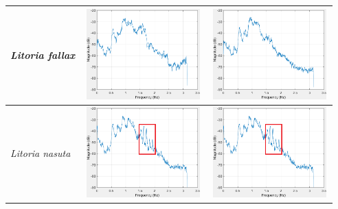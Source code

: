 \begin{table}[htb!]
{\begin{tabular}{lll}
\textit{Litoria fallax}              & \begin{minipage}{.3\textwidth} \includegraphics[width=45mm, height=35mm]{image/Ch1/4_signal.png}  \end{minipage}                             &                                               \begin{minipage}{.3\textwidth} \includegraphics[width=45mm, height=35mm]{image/Ch1/4_noise.png}  \end{minipage} \\ \hline
\textit{Litoria nasuta}              &   \begin{minipage}{.3\textwidth} \includegraphics[width=45mm, height=35mm]{image/Ch1/5_signal.png}  \end{minipage}                           &                                               \begin{minipage}{.3\textwidth} \includegraphics[width=45mm, height=35mm]{image/Ch1/5_signal.png}  \end{minipage} \\ \hline
\end{tabular}
}
\end{table}


